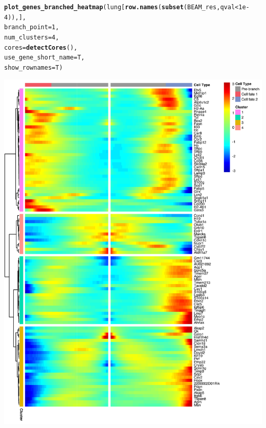 \documentclass[10pt,oneside]{article}\usepackage[]{graphicx}\usepackage[]{color}
\makeatletter
\def\maxwidth{ %
  \ifdim\Gin@nat@width>\linewidth
    \linewidth
  \else
    \Gin@nat@width
  \fi
}
\newcommand{\hlnum}[1]{\textcolor[rgb]{0.686,0.059,0.569}{#1}}%
\newcommand{\hlopt}[1]{\textcolor[rgb]{0,0,0}{#1}}%
\newcommand{\hlstd}[1]{\textcolor[rgb]{0.345,0.345,0.345}{#1}}%
\newcommand{\hlkwc}[1]{\textcolor[rgb]{0.333,0.667,0.333}{#1}}%
\newcommand{\hlkwd}[1]{\textcolor[rgb]{0.737,0.353,0.396}{\textbf{#1}}}%
\newenvironment{kframe}{%
 \def\at@end@of@kframe{}%
 \ifinner\ifhmode%
  \def\at@end@of@kframe{\end{minipage}}%
  \begin{minipage}{\columnwidth}%
 \fi\fi%
 \def\FrameCommand##1{\hskip\@totalleftmargin \hskip-\fboxsep
 \colorbox{shadecolor}{##1}\hskip-\fboxsep
     \hskip-\linewidth \hskip-\@totalleftmargin \hskip\columnwidth}%
 \MakeFramed {\advance\hsize-\width
   \@totalleftmargin\z@ \linewidth\hsize
   \@setminipage}}%
 {\par\unskip\endMakeFramed%
 \at@end@of@kframe}
\newenvironment{knitrout}{}{} %
\makeatother
\begin{document}
\begin{knitrout}
\color{fgcolor}\begin{kframe}
\begin{alltt}
\hlkwd{plot_genes_branched_heatmap}\hlstd{(lung[}\hlkwd{row.names}\hlstd{(}\hlkwd{subset}\hlstd{(BEAM_res, qval} \hlopt{<} \hlnum{1e-4}\hlstd{)),],}
                            \hlkwc{branch_point} \hlstd{=} \hlnum{1}\hlstd{,}
                            \hlkwc{num_clusters} \hlstd{=} \hlnum{4}\hlstd{,}
                            \hlkwc{cores} \hlstd{=} \hlkwd{detectCores}\hlstd{(),}
                            \hlkwc{use_gene_short_name} \hlstd{= T,}
                            \hlkwc{show_rownames} \hlstd{= T)}
\end{alltt}
\end{kframe}

{\centering \includegraphics[width=\maxwidth]{figure/lung_beam_branched_heatmap-1} 

}



\end{knitrout}
\end{document}
